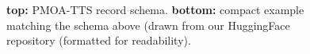 \begin{figure}[htbp]
\begin{ChFiveFloatBody}
\end{ChFiveFloatBody}
\caption{\textbf{top:} PMOA-TTS record schema. \textbf{bottom:} compact example matching the schema above (drawn from our HuggingFace repository (formatted for readability).}
\end{figure}